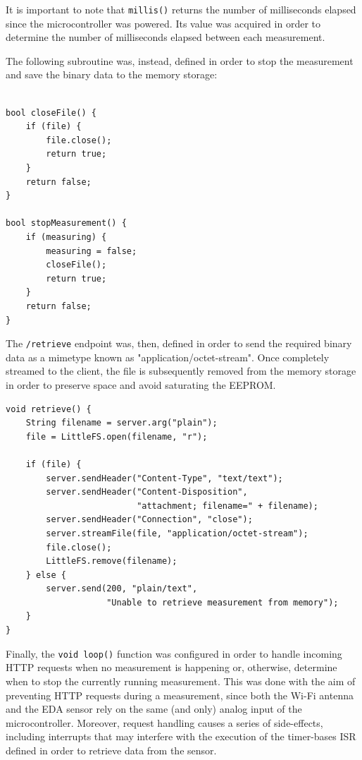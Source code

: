 It is important to note that \texttt{millis()} returns the number of milliseconds elapsed since the microcontroller was powered. Its value was acquired in order to determine the number of milliseconds elapsed between each measurement.

The following subroutine was, instead, defined in order to stop the measurement and save the binary data to the memory storage:

\begin{verbatim}

bool closeFile() {
    if (file) {
        file.close();
        return true;
    }
    return false;
}

bool stopMeasurement() {
    if (measuring) {
        measuring = false;
        closeFile();
        return true;
    }
    return false;
}
\end{verbatim}

The \texttt{/retrieve} endpoint was, then, defined in order to send the required binary data as a mimetype known as "application/octet-stream". Once completely streamed to the client, the file is subsequently removed from the memory storage in order to preserve space and avoid saturating the EEPROM.

\begin{verbatim}
void retrieve() {
    String filename = server.arg("plain");
    file = LittleFS.open(filename, "r");

    if (file) {
        server.sendHeader("Content-Type", "text/text");
        server.sendHeader("Content-Disposition", 
                          "attachment; filename=" + filename);
        server.sendHeader("Connection", "close");
        server.streamFile(file, "application/octet-stream");
        file.close();
        LittleFS.remove(filename);
    } else {
        server.send(200, "plain/text", 
                    "Unable to retrieve measurement from memory");
    }
}
\end{verbatim}

Finally, the \texttt{void loop()} function was configured in order to handle incoming HTTP requests when no measurement is happening or, otherwise, determine when to stop the currently running measurement. This was done with the aim of preventing HTTP requests during a measurement, since both the Wi-Fi antenna and the EDA sensor rely on the same (and only) analog input of the microcontroller. Moreover, request handling causes a series of side-effects, including interrupts that may interfere with the execution of the timer-bases ISR defined in order to retrieve data from the sensor.

